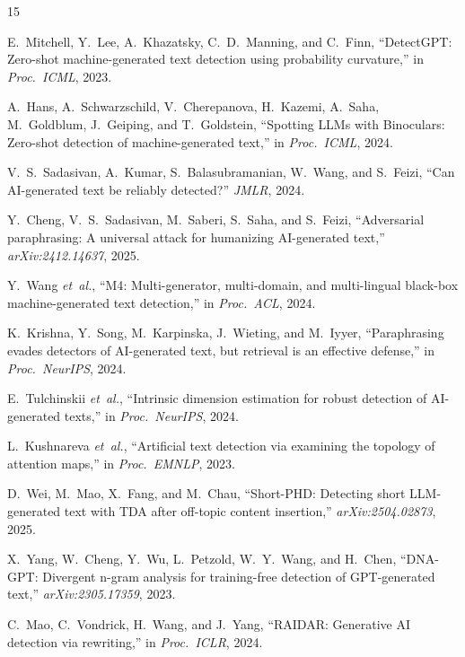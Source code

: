 \documentclass[conference]{IEEEtran}
\begin{document}

\begin{thebibliography}{15}

E.~Mitchell, Y.~Lee, A.~Khazatsky, C.~D.~Manning, and C.~Finn,
``{DetectGPT}: Zero-shot machine-generated text detection using probability curvature,''
in \textit{Proc.\ ICML}, 2023.

A.~Hans, A.~Schwarzschild, V.~Cherepanova, H.~Kazemi, A.~Saha, M.~Goldblum, J.~Geiping, and T.~Goldstein,
``Spotting {LLMs} with {Binoculars}: Zero-shot detection of machine-generated text,''
in \textit{Proc.\ ICML}, 2024.

V.~S.~Sadasivan, A.~Kumar, S.~Balasubramanian, W.~Wang, and S.~Feizi,
``Can {AI}-generated text be reliably detected?''
\textit{JMLR}, 2024.

Y.~Cheng, V.~S.~Sadasivan, M.~Saberi, S.~Saha, and S.~Feizi,
``Adversarial paraphrasing: A universal attack for humanizing {AI}-generated text,''
\textit{arXiv:2412.14637}, 2025.

Y.~Wang \textit{et~al.},
``{M4}: Multi-generator, multi-domain, and multi-lingual black-box machine-generated text detection,''
in \textit{Proc.\ ACL}, 2024.

K.~Krishna, Y.~Song, M.~Karpinska, J.~Wieting, and M.~Iyyer,
``Paraphrasing evades detectors of {AI}-generated text, but retrieval is an effective defense,''
in \textit{Proc.\ NeurIPS}, 2024.

E.~Tulchinskii \textit{et~al.},
``Intrinsic dimension estimation for robust detection of {AI}-generated texts,''
in \textit{Proc.\ NeurIPS}, 2024.

L.~Kushnareva \textit{et~al.},
``Artificial text detection via examining the topology of attention maps,''
in \textit{Proc.\ EMNLP}, 2023.

D.~Wei, M.~Mao, X.~Fang, and M.~Chau,
``{Short-PHD}: Detecting short {LLM}-generated text with {TDA} after off-topic content insertion,''
\textit{arXiv:2504.02873}, 2025.

X.~Yang, W.~Cheng, Y.~Wu, L.~Petzold, W.~Y.~Wang, and H.~Chen,
``{DNA-GPT}: Divergent n-gram analysis for training-free detection of {GPT}-generated text,''
\textit{arXiv:2305.17359}, 2023.

C.~Mao, C.~Vondrick, H.~Wang, and J.~Yang,
``{RAIDAR}: Generative {AI} detection via rewriting,''
in \textit{Proc.\ ICLR}, 2024.


\end{thebibliography}
\end{document}
